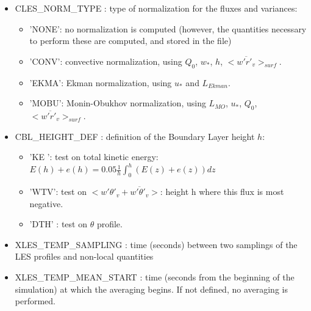 \begin{itemize}
%
%

\item
CLES\_NORM\_TYPE    : type of normalization for the fluxes and variances:
\begin{itemize}
\item 'NONE': no normalization is computed (however, the quantities necessary
to perform these are computed, and stored in the file)
\item 'CONV': convective normalization, using $Q_0$, $w_*$, $h$,
$<\overline{w'r'_v}>_{surf}$.
\item 'EKMA': Ekman normalization, using $u_*$ and $L_{Ekman}$.
\item 'MOBU': Monin-Obukhov normalization, using $L_{MO}$, $u_*$, $Q_0$,
$<\overline{w'r'_v}>_{surf}$.
\end{itemize}

\item
CBL\_HEIGHT\_DEF    : definition of the Boundary Layer height $h$:
\begin{itemize}
\item 'KE ': test on total   kinetic energy: $E(h) + e(h) = 
0.05 \frac{1}{h} \int_0^h{(E(z)+e(z))dz}$
\item 'WTV': test on $<w'\theta'_v + \overline{w'\theta'_v }>$: height
h where this flux is most negative.
\item 'DTH' : test on $\theta$ profile.
\end{itemize}

\item
XLES\_TEMP\_SAMPLING  : time (seconds) between two samplings of the
LES profiles and non-local quantities

\item
XLES\_TEMP\_MEAN\_START   : time (seconds from the beginning of the simulation)
at which the averaging begins. If not defined, no averaging is performed.


\end{itemize}
